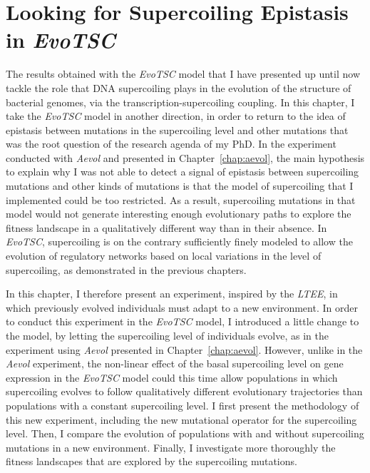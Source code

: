\chapter{Looking for Supercoiling Epistasis in \emph{EvoTSC}}
\label{chap:epistasis}

The results obtained with the \emph{EvoTSC} model that I have presented up until now tackle the role that DNA supercoiling plays in the evolution of the structure of bacterial genomes, via the transcription-supercoiling coupling.
In this chapter, I take the \emph{EvoTSC} model in another direction, in order to return to the idea of epistasis between mutations in the supercoiling level and other mutations that was the root question of the research agenda of my PhD.
In the experiment conducted with \emph{Aevol} and presented in Chapter~\ref{chap:aevol}, the main hypothesis to explain why I was not able to detect a signal of epistasis between supercoiling mutations and other kinds of mutations is that the model of supercoiling that I implemented could be too restricted.
As a result, supercoiling mutations in that model would not generate interesting enough evolutionary paths to explore the fitness landscape in a qualitatively different way than in their absence.
In \emph{EvoTSC}, supercoiling is on the contrary sufficiently finely modeled to allow the evolution of regulatory networks based on local variations in the level of supercoiling, as demonstrated in the previous chapters.

In this chapter, I therefore present an experiment, inspired by the \emph{LTEE}, in which previously evolved individuals must adapt to a new environment.
In order to conduct this experiment in the \emph{EvoTSC} model, I introduced a little change to the model, by letting the supercoiling level of individuals evolve, as in the experiment using \emph{Aevol} presented in Chapter~\ref{chap:aevol}.
However, unlike in the \emph{Aevol} experiment, the non-linear effect of the basal supercoiling level on gene expression in the \emph{EvoTSC} model could this time allow populations in which supercoiling evolves to follow qualitatively different evolutionary trajectories than populations with a constant supercoiling level.
I first present the methodology of this new experiment, including  the new mutational operator for the supercoiling level.
Then, I compare the evolution of populations with and without supercoiling mutations in a new environment.
Finally, I investigate more thoroughly the fitness landscapes that are explored by the supercoiling mutations.


